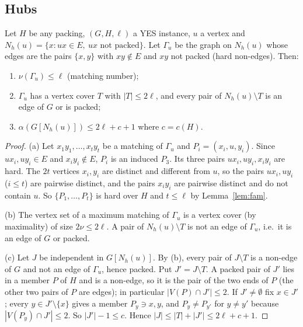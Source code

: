 \subsection{Hubs}
\begin{lemma}[HUB$^+$]\label{lem:HUB}
Let $H$ be any packing, $(G,H,\ell)$ a YES instance, $u$ a vertex and $N_h(u)=\{x:ux\in E,\ ux\text{ not packed}\}$. Let $\Gamma_u$ be the graph on $N_h(u)$ whose edges are the pairs $\{x,y\}$ with $xy\notin E$ and $xy$ not packed (hard non-edges). Then:
\begin{enumerate}
\item[(a)] $\nu(\Gamma_u)\le\ell$ (matching number);
\item[(b)] $\Gamma_u$ has a vertex cover $T$ with $|T|\le2\ell$, and every pair of $N_h(u)\setminus T$ is an edge of $G$ or is packed;
\item[(c)] $\alpha(G[N_h(u)])\le 2\ell+c+1$ where $c=c(H)$.
\end{enumerate}
\end{lemma}
\begin{proof}
(a) Let $x_1y_1,\dots,x_ty_t$ be a matching of $\Gamma_u$ and $P_i=(x_i,u,y_i)$. Since $ux_i,uy_i\in E$ and $x_iy_i\notin E$, $P_i$ is an induced $P_3$. Its three pairs $ux_i,uy_i,x_iy_i$ are hard. The $2t$ vertices $x_i,y_i$ are distinct and different from $u$, so the pairs $ux_i,uy_i$ ($i\le t$) are pairwise distinct, and the pairs $x_iy_i$ are pairwise distinct and do not contain $u$. So $\{P_1,\dots,P_t\}$ is hard over $H$ and $t\le\ell$ by Lemma~\ref{lem:fam}.

(b) The vertex set of a maximum matching of $\Gamma_u$ is a vertex cover (by maximality) of size $2\nu\le2\ell$. A pair of $N_h(u)\setminus T$ is not an edge of $\Gamma_u$, i.e.\ it is an edge of $G$ or packed.

(c) Let $J$ be independent in $G[N_h(u)]$. By (b), every pair of $J\setminus T$ is a non-edge of $G$ and not an edge of $\Gamma_u$, hence packed. Put $J'=J\setminus T$. A packed pair of $J'$ lies in a member $P$ of $H$ and is a non-edge, so it is the pair of the two ends of $P$ (the other two pairs of $P$ are edges); in particular $|V(P)\cap J'|\le2$. If $J'\ne\emptyset$ fix $x\in J'$; every $y\in J'\setminus\{x\}$ gives a member $P_y\ni x,y$, and $P_y\ne P_{y'}$ for $y\ne y'$ because $|V(P_y)\cap J'|\le2$. So $|J'|-1\le c$. Hence $|J|\le|T|+|J'|\le2\ell+c+1$.
\end{proof}

